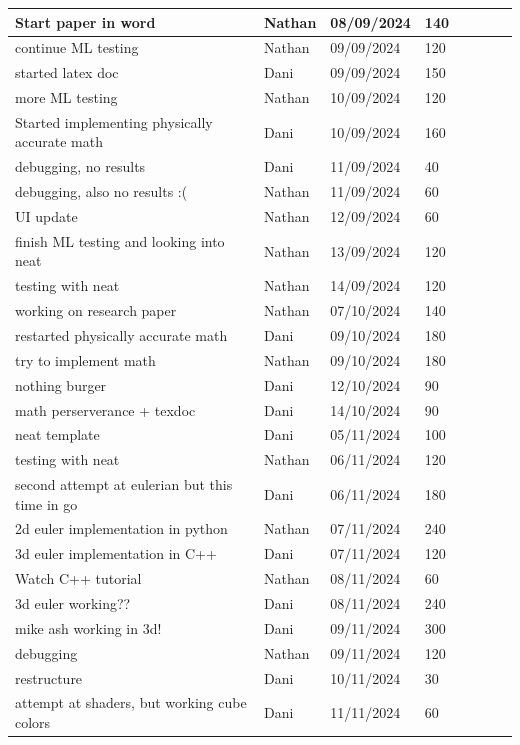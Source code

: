 \documentclass[a4paper,12pt,titlepage]{article}
\begin{document}
\begin{longtable}{|p{200pt}|l|l|l|l|l|l|l|}
	Start paper in word & Nathan & 08/09/2024 & 140 \\ \hline
	continue ML testing & Nathan & 09/09/2024 & 120 \\ \hline
	started latex doc & Dani & 09/09/2024 & 150 \\ \hline
	more ML testing & Nathan & 10/09/2024 & 120 \\ \hline
	Started implementing physically accurate math & Dani & 10/09/2024 & 160 \\ \hline
	debugging, no results & Dani & 11/09/2024 & 40 \\ \hline
	debugging, also no results :( & Nathan & 11/09/2024 & 60 \\ \hline
	UI update & Nathan & 12/09/2024 & 60 \\ \hline
	finish ML testing and looking into neat & Nathan & 13/09/2024 & 120 \\ \hline
	testing with neat & Nathan & 14/09/2024 & 120 \\ \hline
	working on research paper & Nathan & 07/10/2024 & 140 \\ \hline
	restarted physically accurate math & Dani & 09/10/2024 & 180 \\ \hline
	try to implement math & Nathan & 09/10/2024 & 180 \\ \hline
	nothing burger & Dani & 12/10/2024 & 90 \\ \hline
	math perserverance + texdoc & Dani & 14/10/2024 & 90 \\ \hline
	neat template & Dani & 05/11/2024 & 100 \\ \hline
	testing with neat & Nathan & 06/11/2024 & 120 \\ \hline
	second attempt at eulerian but this time in go & Dani & 06/11/2024 & 180 \\ \hline
	2d euler implementation in python & Nathan & 07/11/2024 & 240 \\ \hline
	3d euler implementation in C++ & Dani & 07/11/2024 & 120 \\ \hline
	Watch C++ tutorial  & Nathan & 08/11/2024 & 60 \\ \hline
	3d euler working?? & Dani & 08/11/2024 & 240 \\ \hline
	mike ash working in 3d! & Dani & 09/11/2024 & 300 \\ \hline
	debugging & Nathan & 09/11/2024 & 120 \\ \hline
	restructure & Dani & 10/11/2024 & 30 \\ \hline
	attempt at shaders, but working cube colors & Dani & 11/11/2024 & 60 \\ \hline

\end{longtable}
\end{document}
